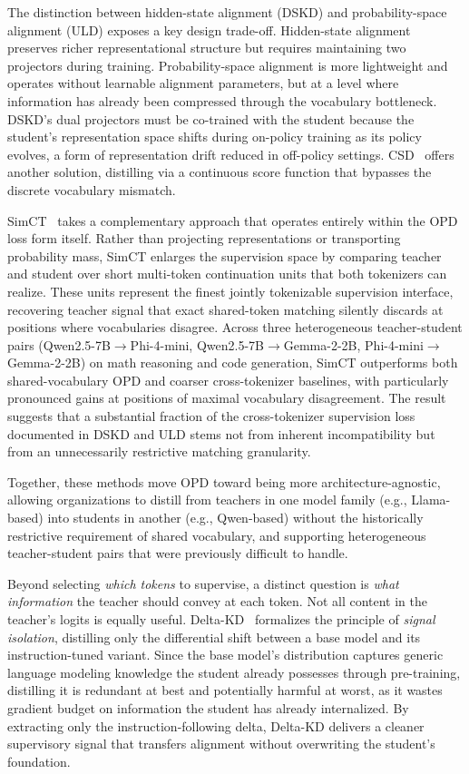 \documentclass{article} %
\begin{document}
The distinction between hidden-state alignment (DSKD) and probability-space alignment (ULD) exposes a key design trade-off. Hidden-state alignment preserves richer representational structure but requires maintaining two projectors during training. Probability-space alignment is more lightweight and operates without learnable alignment parameters, but at a level where information has already been compressed through the vocabulary bottleneck. DSKD's dual projectors must be co-trained with the student because the student's representation space shifts during on-policy training as its policy evolves, a form of representation drift reduced in off-policy settings. CSD~\citep{2509.25837} offers another solution, distilling via a continuous score function that bypasses the discrete vocabulary mismatch.

SimCT~\citep{2605.07711} takes a complementary approach that operates entirely within the OPD loss form itself. Rather than projecting representations or transporting probability mass, SimCT enlarges the supervision space by comparing teacher and student over short multi-token continuation units that both tokenizers can realize. These units represent the finest jointly tokenizable supervision interface, recovering teacher signal that exact shared-token matching silently discards at positions where vocabularies disagree. Across three heterogeneous teacher-student pairs (Qwen2.5-7B$\to$Phi-4-mini, Qwen2.5-7B$\to$Gemma-2-2B, Phi-4-mini$\to$Gemma-2-2B) on math reasoning and code generation, SimCT outperforms both shared-vocabulary OPD and coarser cross-tokenizer baselines, with particularly pronounced gains at positions of maximal vocabulary disagreement. The result suggests that a substantial fraction of the cross-tokenizer supervision loss documented in DSKD and ULD stems not from inherent incompatibility but from an unnecessarily restrictive matching granularity.

Together, these methods move OPD toward being more architecture-agnostic, allowing organizations to distill from teachers in one model family (e.g., Llama-based) into students in another (e.g., Qwen-based) without the historically restrictive requirement of shared vocabulary, and supporting heterogeneous teacher-student pairs that were previously difficult to handle.

Beyond selecting \emph{which tokens} to supervise, a distinct question is \emph{what information} the teacher should convey at each token. Not all content in the teacher's logits is equally useful. Delta-KD~\citep{2509.14526} formalizes the principle of \emph{signal isolation}, distilling only the differential shift between a base model and its instruction-tuned variant. Since the base model's distribution captures generic language modeling knowledge the student already possesses through pre-training, distilling it is redundant at best and potentially harmful at worst, as it wastes gradient budget on information the student has already internalized. By extracting only the instruction-following delta, Delta-KD delivers a cleaner supervisory signal that transfers alignment without overwriting the student's foundation.
\end{document}
